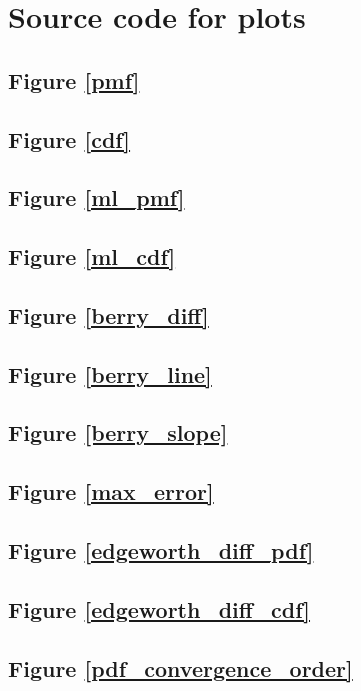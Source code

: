 \chapter{Source code for plots}

\newcommand*{\src}[1]{\section{Figure \ref{#1}}

}

\src{pmf}
\src{cdf}
\src{ml_pmf}
\src{ml_cdf}
\src{berry_diff}
\src{berry_line}
\src{berry_slope}
\src{max_error}
\src{edgeworth_diff_pdf}
\src{edgeworth_diff_cdf}
\src{pdf_convergence_order}
